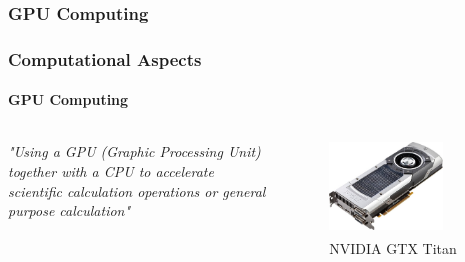 \subsubsection{GPU Computing}
\begin{frame}
    \frametitle{Computational Aspects}
    \framesubtitle{GPU Computing}

    \begin{columns}
        \begin{column}{0.6\textwidth}
            \begin{center}
                \emph{"Using a GPU (Graphic Processing Unit) together with
                a CPU to accelerate scientific calculation operations
                or general purpose calculation"}
            \end{center}
        \end{column}
        \begin{column}{0.4\textwidth}
             \begin{figure}
                 \centering
                 \includegraphics[width=0.8\textwidth]{img/titan}
                 \caption{NVIDIA\textsuperscript{\textregistered} GTX Titan}
                 \label{fig:titan}
             \end{figure}
        \end{column}
    \end{columns}
\end{frame}

